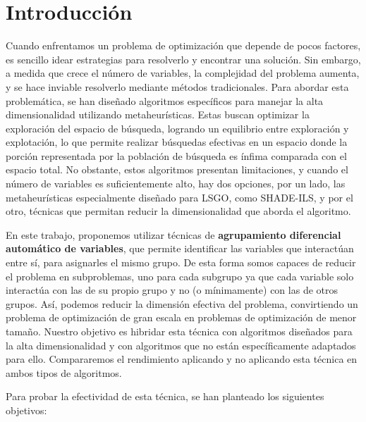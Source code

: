 %


\chapter{Introducción}

\indent Cuando enfrentamos un problema de optimización que depende de pocos factores, es sencillo idear estrategias para resolverlo y encontrar una solución. Sin embargo, a medida que crece el número de variables, la complejidad del problema aumenta, y se hace inviable resolverlo mediante métodos tradicionales. Para abordar esta problemática, se han diseñado algoritmos específicos para manejar la alta dimensionalidad utilizando metaheurísticas. Estas buscan optimizar la exploración del espacio de búsqueda, logrando un equilibrio entre exploración y explotación, lo que permite realizar búsquedas efectivas en un espacio donde la porción representada por la población de búsqueda es ínfima comparada con el espacio total. No obstante, estos algoritmos presentan limitaciones, y cuando el número de variables es suficientemente alto, hay dos opciones, por un lado, las metaheurísticas especialmente diseñado para LSGO, como SHADE-ILS, y por el otro, técnicas que permitan reducir la dimensionalidad que aborda el algoritmo.

En este trabajo, proponemos utilizar técnicas de \textbf{agrupamiento diferencial automático de variables}, que permite identificar las variables que interactúan entre sí, para asignarles el mismo grupo. De esta forma somos capaces de reducir el problema en subproblemas, uno para cada subgrupo ya que cada variable solo interactúa con las de su propio grupo y no (o mínimamente) con las de otros grupos. Así, podemos reducir la dimensión efectiva del problema, convirtiendo un problema de optimización de gran escala en problemas de optimización de menor tamaño. Nuestro objetivo es hibridar esta técnica con algoritmos diseñados para la alta dimensionalidad y con algoritmos que no están específicamente adaptados para ello. Compararemos el rendimiento aplicando y no aplicando esta técnica en ambos tipos de algoritmos.

Para probar la efectividad de esta técnica, se han planteado los siguientes objetivos:

